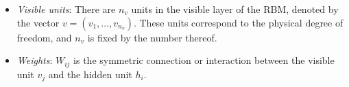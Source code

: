 \documentclass[submission, Phys, hidelnks]{SciPost}
\begin{document}
\begin{itemize}
\item {\it Visible units}: There are $n_v$ units in the visible layer of the RBM, denoted by the vector $v=(v_1, ..., v_{n_v})$. These units correspond to the physical degree of freedom, and $n_v$ is fixed by the number thereof.

\item {\it Weights}: $W_{ij}$ is the symmetric connection or interaction between the visible unit $v_j$ and the hidden unit $h_i$.

\end{itemize}



\nolinenumbers
\end{document}
